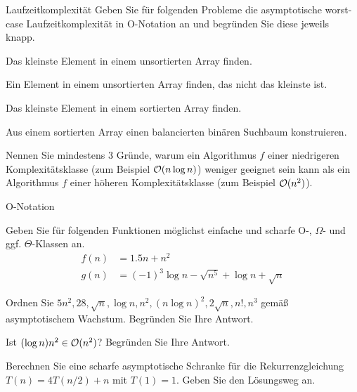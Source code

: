 \documentclass{exercisesheet}
\begin{document}
\begin{eexercises}{Laufzeitkomplexität}{
    Geben Sie für folgenden Probleme die asymptotische worst-case Laufzeitkomplexität in O-Notation an und begründen Sie diese jeweils knapp.
  }
  \item Das kleinste Element in einem unsortierten Array finden.
  \item Ein Element in einem unsortierten Array finden, das nicht das kleinste ist.
  \item Das kleinste Element in einem sortierten Array finden.
  \item Aus einem sortierten Array einen balancierten binären Suchbaum konstruieren.
  \item Nennen Sie mindestens 3 Gründe, warum ein Algorithmus $f$ einer niedrigeren Komplexitätsklasse (zum Beispiel $\mathcal{O}(n \log n)$) weniger geeignet sein kann als ein Algorithmus $f$ einer höheren Komplexitätsklasse (zum Beispiel $\mathcal{O}(n^2)$).
\end{eexercises}

\begin{exercises}{O-Notation}
\item Geben Sie für folgenden Funktionen möglichst einfache und scharfe O-, $\Omega$- und ggf. $\Theta$-Klassen an.
\begin{align*}
  f(n) & = 1.5n + n^2                                     \\
  g(n) & = (-1)^3 \log n - \sqrt{n^5} + \log n + \sqrt{n}
\end{align*}
\item Ordnen Sie $5n^2, 28, \sqrt{n}, \log n, n^2, (n \log n)^2, 2\sqrt{n}, n!, n^3$ gemäß asymptotischem Wachstum. Begründen Sie Ihre Antwort.
\item Ist $(\log n)n^2 \in \mathcal{O}(n^2)$? Begründen Sie Ihre Antwort.
\item Berechnen Sie eine scharfe asymptotische Schranke für die Rekurrenzgleichung $T(n) = 4T(n/2) + n$ mit $T(1) = 1$. Geben Sie den Lösungsweg an.
\end{exercises}
\end{document}
